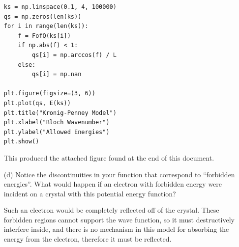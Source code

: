 \documentclass[a4paper,twoside]{article}
\begin{document}
\begin{itemize}
\begin{problem}
\begin{verbatim}
ks = np.linspace(0.1, 4, 100000)
qs = np.zeros(len(ks))
for i in range(len(ks)):
    f = FofQ(ks[i])
    if np.abs(f) < 1:
        qs[i] = np.arccos(f) / L
    else:
        qs[i] = np.nan

plt.figure(figsize=(3, 6))
plt.plot(qs, E(ks))
plt.title("Kronig-Penney Model")
plt.xlabel("Bloch Wavenumber")
plt.ylabel("Allowed Energies")
plt.show()

            \end{verbatim}
            \hr

            This produced the attached figure found at the end of this document. 
        \end{problem}
    \item[(d)] Notice the discontinuities in your function that correspond to ``forbidden energies''. What would happen if an electron with forbidden energy were incident on a crystal with this potential energy function?
        \begin{problem}
            Such an electron would be completely reflected off of the crystal. These forbidden regions cannot support the wave function, so it must destructively interfere inside, and there is no mechanism in this model for absorbing the energy from the electron, therefore it must be reflected.
        \end{problem}
\end{itemize}
\end{document}
